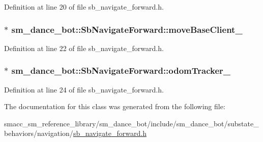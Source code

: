 Definition at line 20 of file sb\+\_\+navigate\+\_\+forward.\+h.

\subsubsection[{\texorpdfstring{move\+Base\+Client\+\_\+}{moveBaseClient_}}]{$\ast$ sm\+\_\+dance\+\_\+bot\+::\+Sb\+Navigate\+Forward\+::move\+Base\+Client\+\_\+}\hypertarget{classsm__dance__bot_1_1SbNavigateForward_a968e1e81e922971fbb7b658e644ce36f}{}\label{classsm__dance__bot_1_1SbNavigateForward_a968e1e81e922971fbb7b658e644ce36f}


Definition at line 22 of file sb\+\_\+navigate\+\_\+forward.\+h.

\subsubsection[{\texorpdfstring{odom\+Tracker\+\_\+}{odomTracker_}}]{$\ast$ sm\+\_\+dance\+\_\+bot\+::\+Sb\+Navigate\+Forward\+::odom\+Tracker\+\_\+}\hypertarget{classsm__dance__bot_1_1SbNavigateForward_ab52cc8f5bf6478324a4d3cc42a03a869}{}\label{classsm__dance__bot_1_1SbNavigateForward_ab52cc8f5bf6478324a4d3cc42a03a869}


Definition at line 24 of file sb\+\_\+navigate\+\_\+forward.\+h.



The documentation for this class was generated from the following file\+:\begin{DoxyCompactItemize}
\item 
smacc\+\_\+sm\+\_\+reference\+\_\+library/sm\+\_\+dance\+\_\+bot/include/sm\+\_\+dance\+\_\+bot/substate\+\_\+behaviors/navigation/\hyperlink{sb__navigate__forward_8h}{sb\+\_\+navigate\+\_\+forward.\+h}\end{DoxyCompactItemize}
